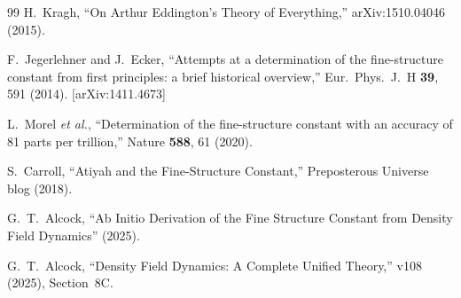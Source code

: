 \documentclass[11pt,a4paper]{article}
\begin{document}
\begin{thebibliography}{99}
 H.~Kragh, ``On Arthur Eddington's Theory of Everything,'' arXiv:1510.04046 (2015).

 F.~Jegerlehner and J.~Ecker, ``Attempts at a determination of the fine-structure constant from first principles: a brief historical overview,'' Eur.~Phys.~J.~H \textbf{39}, 591 (2014). [arXiv:1411.4673]

 L.~Morel \textit{et al.}, ``Determination of the fine-structure constant with an accuracy of 81 parts per trillion,'' Nature \textbf{588}, 61 (2020).

 S.~Carroll, ``Atiyah and the Fine-Structure Constant,'' Preposterous Universe blog (2018).

 G.~T.~Alcock, ``Ab Initio Derivation of the Fine Structure Constant from Density Field Dynamics'' (2025).

 G.~T.~Alcock, ``Density Field Dynamics: A Complete Unified Theory,'' v108 (2025), Section~8C.

\end{thebibliography}
\end{document}
